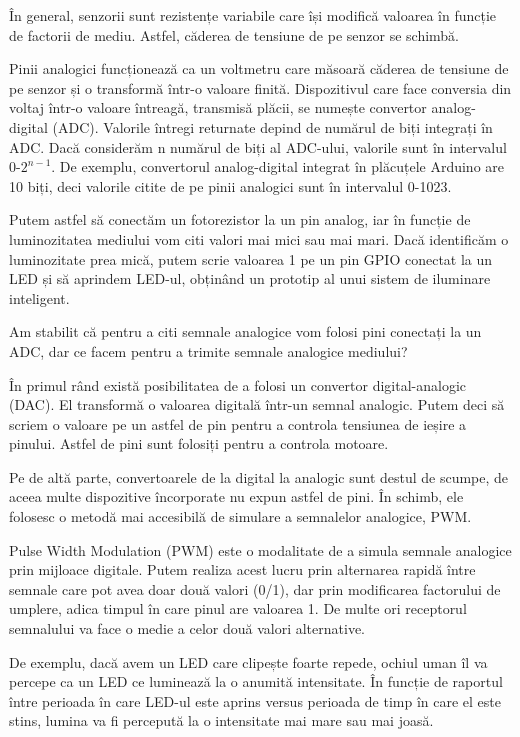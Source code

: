 În general, senzorii sunt rezistențe variabile care își modifică valoarea în
funcție de factorii de mediu. Astfel, căderea de tensiune de pe senzor se
schimbă.

Pinii analogici funcționează ca un voltmetru care măsoară căderea de tensiune de
pe senzor și o transformă într-o valoare finită. Dispozitivul care face
conversia din voltaj într-o valoare întreagă, transmisă plăcii, se numește
convertor analog-digital (ADC). Valorile întregi returnate depind de numărul de
biți integrați în ADC. Dacă considerăm n numărul de biți al ADC-ului, valorile
sunt în intervalul 0-$2^{n-1}$. De exemplu, convertorul analog-digital integrat
în plăcuțele Arduino are 10 biți, deci valorile citite de pe pinii analogici
sunt în intervalul 0-1023.

Putem astfel să conectăm un fotorezistor la un pin analog, iar în funcție de
luminozitatea mediului vom citi valori mai mici sau mai mari. Dacă identificăm o
luminozitate prea mică, putem scrie valoarea 1 pe un pin GPIO conectat la un LED
și să aprindem LED-ul, obținând un prototip al unui sistem de iluminare
inteligent.

Am stabilit că pentru a citi semnale analogice vom folosi pini conectați la un
ADC, dar ce facem pentru a trimite semnale analogice mediului?

În primul rând există posibilitatea de a folosi un convertor digital-analogic
(DAC). El transformă o valoarea digitală într-un semnal analogic. Putem deci să
scriem o valoare pe un astfel de pin pentru a controla tensiunea de ieșire a
pinului. Astfel de pini sunt folosiți pentru a controla motoare.

Pe de altă parte, convertoarele de la digital la analogic sunt destul de scumpe,
de aceea multe dispozitive încorporate nu expun astfel de pini. În schimb, ele
folosesc o metodă mai accesibilă de simulare a semnalelor analogice, PWM.

Pulse Width Modulation (PWM) este o modalitate de a simula semnale analogice
prin mijloace digitale. Putem realiza acest lucru prin alternarea rapidă între
semnale care pot avea doar două valori (0/1), dar prin modificarea factorului de
umplere, adica timpul în care pinul are valoarea 1. De multe ori receptorul
semnalului va face o medie a celor două valori alternative.

De exemplu, dacă avem un LED care clipește foarte repede, ochiul uman îl va
percepe ca un LED ce luminează la o anumită intensitate. În funcție de raportul
între perioada în care LED-ul este aprins versus perioada de timp în care el
este stins, lumina va fi percepută la o intensitate mai mare sau mai joasă.

